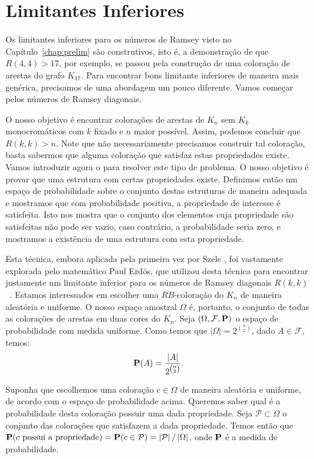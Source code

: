 
\section{Limitantes Inferiores}

Os limitantes inferiores para os números de Ramsey visto no Capítulo~\ref{chap:prelim} são construtivos, isto é, a demonstração de que $R(4,4) > 17$, por exemplo, se passou pela construção de uma coloração de arestas do grafo $K_{17}$. Para encontrar bons limitante inferiores de maneira mais genérica, precisamos de uma abordagem um pouco diferente. Vamos começar pelos números de Ramsey diagonais.

O nosso objetivo é encontrar colorações de arestas de $K_n$ sem $K_k$ monocromáticos com $k$ fixado e $n$ maior possível. Assim, podemos concluir que $R(k,k) > n$. Note que não necessariamente precisamos construir tal coloração, basta sabermos que alguma coloração que satisfaz estas propriedades existe. Vamos introduzir agora o  para resolver este tipo de problema. O nosso objetivo é provar que uma estrutura com certas propriedades existe. Definimos então um espaço de probabilidade sobre o conjunto destas estruturas de maneira adequada e mostramos que com probabilidade positiva, a propriedade de interesse é satisfeita. Isto nos mostra que o conjunto dos elementos cuja propriedade são satisfeitas não pode ser vazio, caso contrário, a probabilidade seria zero, e mostramos a existência de uma estrutura com esta propriedade.

Esta técnica, embora aplicada pela primeira vez por Szele \cite{szele1943kombinatorikai}, foi vastamente explorada pelo matemático Paul Erdös, que utilizou desta técnica para encontrar justamente um limitante inferior para os números de Ramsey diagonais $R(k,k)$~\cite{erdos47}. Estamos interessados em escolher uma $RB$-coloração do $K_n$ de maneira aleatória e uniforme. O nosso espaço amostral $\Omega$ é, portanto, o conjunto de todas as colorações de arestas em duas cores do $K_n$. Seja $(\Omega, \mathcal{F}, \operatorname{\mathbf{P}})$ o espaço de probabilidade com medida uniforme. Como temos que $|\Omega| = 2^{\binom{n}{2}}$, dado $A \in \mathcal{F}$, temos:
\[ \operatorname{\mathbf{P}}(A) = \frac{|A|}{2^{\binom{n}{2}}}.\]

Suponha que escolhemos uma coloração $c \in \Omega$ de maneira aleatória e uniforme, de acordo com o espaço de probabilidade acima. Queremos saber qual é a probabilidade desta coloração possuir uma dada propriedade. Seja $\mathcal{P} \subset \Omega$ o conjunto das colorações que satisfazem a dada propriedade. Temos então que $\operatorname{\mathbf{P}}(c \text{ possui a propriedade}) = \operatorname{\mathbf{P}}(c \in \mathcal{P}) = \left | \mathcal{P} \right | / \left | \Omega \right |$, onde $\operatorname{\mathbf{P}}$ é a medida de probabilidade.

